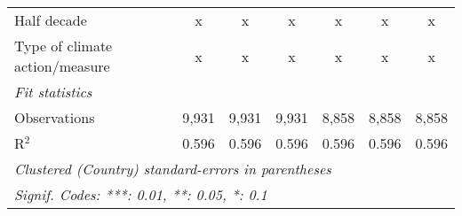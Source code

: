 \begin{tabular}{lcccccc}
   Half decade                                        & x            & x             & x             & x            & x             & x\\  
   Type of climate action/measure                     & x            & x             & x             & x            & x             & x\\  
   \midrule \emph{Fit statistics}\\
   Observations                                       & 9,931        & 9,931         & 9,931         & 8,858        & 8,858         & 8,858\\  
   R$^2$                                              & 0.596        & 0.596         & 0.596         & 0.596        & 0.596         & 0.596\\  
   \midrule
   \multicolumn{7}{l}{\emph{Clustered (Country) standard-errors in parentheses}}\\
   \multicolumn{7}{l}{\emph{Signif. Codes: ***: 0.01, **: 0.05, *: 0.1}}\\
\end{tabular}
\par\endgroup



